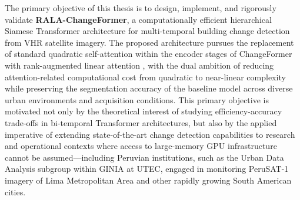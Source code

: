 The primary objective of this thesis is to design, implement, and rigorously
validate \textbf{RALA-ChangeFormer}, a computationally efficient hierarchical
Siamese Transformer architecture for multi-temporal building change detection
from VHR satellite imagery. The proposed architecture pursues the replacement of
standard quadratic self-attention within the encoder stages of ChangeFormer with
rank-augmented linear attention \cite{Fan2025RALA}, with the dual ambition of
reducing attention-related computational cost from quadratic to near-linear
complexity while preserving the segmentation accuracy of the baseline model
across diverse urban environments and acquisition conditions. This primary
objective is motivated not only by the theoretical interest of studying
efficiency-accuracy trade-offs in bi-temporal Transformer architectures, but
also by the applied imperative of extending state-of-the-art change detection
capabilities to research and operational contexts where access to large-memory
GPU infrastructure cannot be assumed---including Peruvian institutions, such as
the Urban Data Analysis subgroup within GINIA at UTEC, engaged in monitoring
PeruSAT-1 imagery of Lima Metropolitan Area and other rapidly growing South
American cities.

